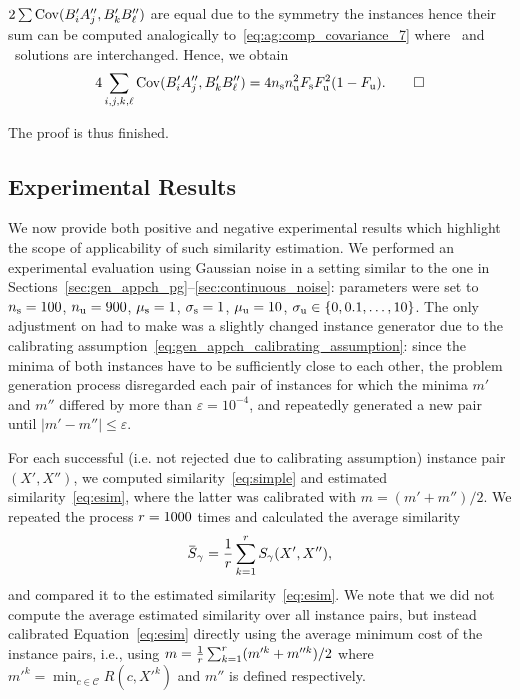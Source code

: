 \begin{itemize}
\begin{itemize}
        $2\sum {\mathrm{Cov}}(B'_i A''_j, B'_k B''_\ell)$ are equal due to the
        symmetry the instances hence their sum can be computed
        analogically to~\eqref{eq:ag:comp_covariance_7} where \good\ and
        \bad\ solutions are interchanged. Hence, we obtain
        \begin{equation*}
          4 \sum_{i,j,k,\ell} {\mathrm{Cov}}(B'_i A''_j, B'_k B''_\ell)
            = 4 n_\text{s} n_\text{u}^2 F_\text{s} F_\text{u}^2 ( 1 - F_\text{u}).
            \qedhere
        \end{equation*}
    \end{itemize}

\end{itemize}
 
The proof is thus finished.
\QEDA

\subsection{Experimental Results}
We now provide both positive and negative experimental results which highlight
the scope of applicability of such similarity estimation.  We performed an
experimental evaluation using Gaussian noise in a setting similar to the one in
Sections~\ref{sec:gen_appch_pg}--\ref{sec:continuous_noise}: parameters were set
to $n_\text{s}=100$, $n_\text{u}=900$, $\mu_{\mathrm{s}}=1$, $\sigma_{\mathrm{s}}=1$, $\mu_{\mathrm{u}}=10$,
$\sigma_{\mathrm{u}}\in\{0,0.1,\ldots,10\}$.
% 
The only adjustment on had to make was a slightly changed instance generator due
to the calibrating assumption~\eqref{eq:gen_appch_calibrating_assumption}: since
the minima of both instances have to be sufficiently close to each other, the
problem generation process disregarded each pair of instances for which the
minima $m'$ and $m''$ differed by more than $\varepsilon=10^{-4}$, and
repeatedly generated a new pair until $|m'-m''|\le
\varepsilon$. 

For each successful (i.e. not rejected due to calibrating assumption) instance
pair $(X',X'')$, we computed similarity~\eqref{eq:simple} and
estimated similarity~\eqref{eq:esim}, where the latter was calibrated with
$m=(m'+m'')/2$. We repeated the process $r=1000$ times and calculated the
average similarity
\begin{equation}
  \mspace{2mu}\overline{\mspace{-2mu}S\mspace{-2mu}}\mspace{2mu}_\gamma=\frac{1}{r}\sum_{k=1}^r S_\gamma(X',X''),
\end{equation}
and compared it to the estimated similarity~\eqref{eq:esim}. We note that we did
not compute the average estimated similarity over all instance pairs, but
instead calibrated Equation~\eqref{eq:esim} directly using the average minimum
cost of the instance pairs, i.e., using $m=\frac{1}{r}\sum_{k=1}^r
(m'^k+m''^k)/2$ where $m'^k=\min_{c \in \mathcal{C}} R(c, X'^k)$ and $m''$ is
defined respectively.

